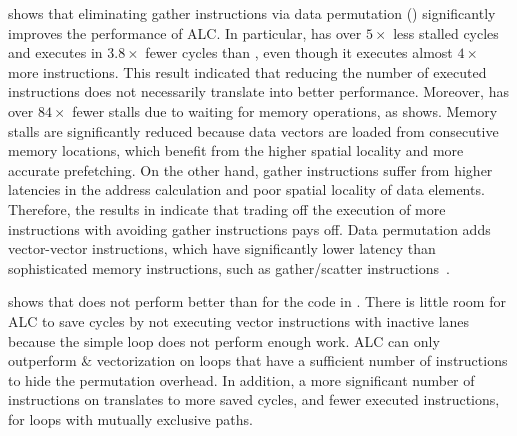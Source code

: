 shows that eliminating gather instructions via data permutation (\ALCdp) significantly improves the performance of ALC.
In particular, \ALCdp has over $5\times$ less stalled cycles and executes in $3.8\times$ fewer cycles than \ALC, even though it executes almost $4\times$ more instructions.
This result indicated that reducing the number of executed instructions does not necessarily translate into better performance.
Moreover, \ALCdp has over $84\times$ fewer stalls due to waiting for memory operations, as  shows.
Memory stalls are significantly reduced because data vectors are loaded from consecutive memory locations, which benefit from the higher spatial locality and more accurate prefetching.
On the other hand, gather instructions suffer from higher latencies in the address calculation and poor spatial locality of data elements.
Therefore, the results in  indicate that trading off the execution of more instructions with avoiding gather instructions pays off.
Data permutation adds vector-vector instructions, which have significantly lower latency than sophisticated memory instructions, such as gather/scatter instructions~\cite{A64FXmanual}.

 shows that \ALCdp does not perform better than \ifconv for the code in .
There is little room for ALC to save cycles by not executing vector instructions with inactive lanes because the simple loop does not perform enough work.
ALC can only outperform \ifconversion \& vectorization on loops that have a sufficient number of instructions to hide the permutation overhead.
In addition, a more significant number of instructions on \cpaths translates to more saved cycles, and fewer executed instructions, for loops with mutually exclusive paths.

